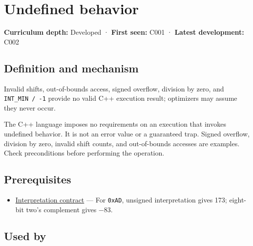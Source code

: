 \hypertarget{appendix-f558f5b4d8f2}{}\label{referencestart:appendix-f558f5b4d8f2}
\section{Undefined behavior}\label{appendix-f558f5b4d8f2-undefined-behavior}

\hypertarget{appendix-f558f5b4d8f2-undefined-behavior}{}

\textbf{Curriculum depth:} Developed · \textbf{First seen:} C001 · \textbf{Latest development:} C002

\begin{allmightroledefinition}

\subsection{Definition and mechanism}\label{appendix-f558f5b4d8f2-definition-and-mechanism}

\hypertarget{appendix-f558f5b4d8f2-definition-and-mechanism}{}

Invalid shifts, out-of-bounds access, signed overflow, division by zero, and \texttt{INT\_MIN\ /\ -1} provide no valid C++ execution result; optimizers may assume they never occur.

\end{allmightroledefinition}

The C++ language imposes no requirements on an execution that invokes undefined behavior. It is not an error value or a guaranteed trap. Signed overflow, division by zero, invalid shift counts, and out-of-bounds accesses are examples. Check preconditions before performing the operation.

\subsection{Prerequisites}\label{appendix-f558f5b4d8f2-prerequisites}

\hypertarget{appendix-f558f5b4d8f2-prerequisites}{}

\begin{itemize}
\tightlist
\item
  \hyperref[appendix-f414bd4ed05c]{Interpretation contract} --- For \texttt{0xAD}, unsigned interpretation gives 173; eight-bit two's complement gives −83.
\end{itemize}

\subsection{Used by}\label{appendix-f558f5b4d8f2-used-by}

